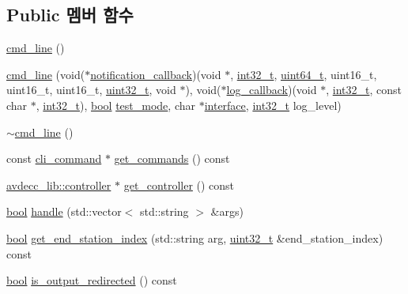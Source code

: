 \subsection*{Public 멤버 함수}
\begin{DoxyCompactItemize}
\item 
\hyperlink{classcmd__line_ab530da2b5e73101d2b7a1b66bbc2c66f}{cmd\+\_\+line} ()
\item 
\hyperlink{classcmd__line_a716f7f33515425c79ae41121801320c7}{cmd\+\_\+line} (void($\ast$\hyperlink{notification__main_8cpp_a0ac846a129e0f5cc0f199a57f19dcdf0}{notification\+\_\+callback})(void $\ast$, \hyperlink{parse_8c_a37994e3b11c72957c6f454c6ec96d43d}{int32\+\_\+t}, \hyperlink{parse_8c_aec6fcb673ff035718c238c8c9d544c47}{uint64\+\_\+t}, uint16\+\_\+t, uint16\+\_\+t, uint16\+\_\+t, \hyperlink{parse_8c_a6eb1e68cc391dd753bc8ce896dbb8315}{uint32\+\_\+t}, void $\ast$), void($\ast$\hyperlink{log__main_8cpp_ada1b24c3a6e3b693689b6af49d269216}{log\+\_\+callback})(void $\ast$, \hyperlink{parse_8c_a37994e3b11c72957c6f454c6ec96d43d}{int32\+\_\+t}, const char $\ast$, \hyperlink{parse_8c_a37994e3b11c72957c6f454c6ec96d43d}{int32\+\_\+t}), \hyperlink{avb__gptp_8h_af6a258d8f3ee5206d682d799316314b1}{bool} \hyperlink{classcmd__line_a07c66893ce868671f9998dad80094cb1}{test\+\_\+mode}, char $\ast$\hyperlink{rawsock__tx_8c_af663a7576d2f8f288bb3996381484cd3}{interface}, \hyperlink{parse_8c_a37994e3b11c72957c6f454c6ec96d43d}{int32\+\_\+t} log\+\_\+level)
\item 
\hyperlink{classcmd__line_aded54b241b313595eda98e2de3a0ba5e}{$\sim$cmd\+\_\+line} ()
\item 
const \hyperlink{classcli__command}{cli\+\_\+command} $\ast$ \hyperlink{classcmd__line_a6e685afe053e74705b7a12e778027856}{get\+\_\+commands} () const 
\item 
\hyperlink{classavdecc__lib_1_1controller}{avdecc\+\_\+lib\+::controller} $\ast$ \hyperlink{classcmd__line_a36ce5287fc73be502aebfe6f76807759}{get\+\_\+controller} () const 
\item 
\hyperlink{avb__gptp_8h_af6a258d8f3ee5206d682d799316314b1}{bool} \hyperlink{classcmd__line_ac354d66fb914d572760863d0cefe8f99}{handle} (std\+::vector$<$ std\+::string $>$ \&args)
\item 
\hyperlink{avb__gptp_8h_af6a258d8f3ee5206d682d799316314b1}{bool} \hyperlink{classcmd__line_a84930ee2ce89caaf47c2e4b122510d0e}{get\+\_\+end\+\_\+station\+\_\+index} (std\+::string arg, \hyperlink{parse_8c_a6eb1e68cc391dd753bc8ce896dbb8315}{uint32\+\_\+t} \&end\+\_\+station\+\_\+index) const 
\item 
\hyperlink{avb__gptp_8h_af6a258d8f3ee5206d682d799316314b1}{bool} \hyperlink{classcmd__line_a91bd295d07a4814fc1b4200d0813cbcd}{is\+\_\+output\+\_\+redirected} () const 
\end{DoxyCompactItemize}
